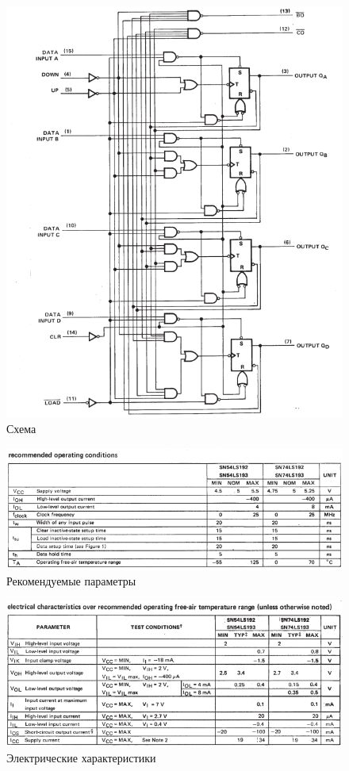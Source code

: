 \begin{figure}[H]
	\centering
	\includegraphics[width=0.95\linewidth]{imgs/14/14_sh}
	\caption{Схема}
	\label{fig:14_sh}
\end{figure}

\begin{figure}[H]
	\centering
	\includegraphics[width=0.95\linewidth]{imgs/14/14_rec}
	\caption{Рекомендуемые параметры}
	\label{fig:14_rec}
\end{figure}

\begin{figure}[H]
	\centering
	\includegraphics[width=0.95\linewidth]{imgs/14/14_ch}
	\caption{Электрические характеристики}
	\label{fig:14_ch}
\end{figure}

